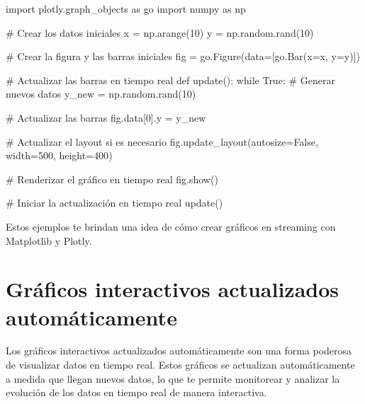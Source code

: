 \documentclass[
  a4paper,
]{article}
\newenvironment{Shaded}{}{}
\newcommand{\CommentTok}[1]{\textcolor[rgb]{0.42,0.45,0.49}{#1}}
\newcommand{\ControlFlowTok}[1]{\textcolor[rgb]{0.84,0.23,0.29}{#1}}
\newcommand{\DecValTok}[1]{\textcolor[rgb]{0.00,0.36,0.77}{#1}}
\newcommand{\ImportTok}[1]{\textcolor[rgb]{0.01,0.18,0.38}{#1}}
\newcommand{\KeywordTok}[1]{\textcolor[rgb]{0.84,0.23,0.29}{#1}}
\newcommand{\NormalTok}[1]{\textcolor[rgb]{0.14,0.16,0.18}{#1}}
\newcommand{\OperatorTok}[1]{\textcolor[rgb]{0.14,0.16,0.18}{#1}}
\newcommand{\VariableTok}[1]{\textcolor[rgb]{0.89,0.38,0.04}{#1}}
\begin{document}
\begin{Shaded}
\begin{Highlighting}[]
\ImportTok{import}\NormalTok{ plotly.graph\_objects }\ImportTok{as}\NormalTok{ go}
\ImportTok{import}\NormalTok{ numpy }\ImportTok{as}\NormalTok{ np}

\CommentTok{\# Crear los datos iniciales}
\NormalTok{x }\OperatorTok{=}\NormalTok{ np.arange(}\DecValTok{10}\NormalTok{)}
\NormalTok{y }\OperatorTok{=}\NormalTok{ np.random.rand(}\DecValTok{10}\NormalTok{)}

\CommentTok{\# Crear la figura y las barras iniciales}
\NormalTok{fig }\OperatorTok{=}\NormalTok{ go.Figure(data}\OperatorTok{=}\NormalTok{[go.Bar(x}\OperatorTok{=}\NormalTok{x, y}\OperatorTok{=}\NormalTok{y)])}

\CommentTok{\# Actualizar las barras en tiempo real}
\KeywordTok{def}\NormalTok{ update():}
    \ControlFlowTok{while} \VariableTok{True}\NormalTok{:}
        \CommentTok{\# Generar nuevos datos}
\NormalTok{        y\_new }\OperatorTok{=}\NormalTok{ np.random.rand(}\DecValTok{10}\NormalTok{)}

        \CommentTok{\# Actualizar las barras}
\NormalTok{        fig.data[}\DecValTok{0}\NormalTok{].y }\OperatorTok{=}\NormalTok{ y\_new}

        \CommentTok{\# Actualizar el layout si es necesario}
\NormalTok{        fig.update\_layout(autosize}\OperatorTok{=}\VariableTok{False}\NormalTok{, width}\OperatorTok{=}\DecValTok{500}\NormalTok{, height}\OperatorTok{=}\DecValTok{400}\NormalTok{)}

        \CommentTok{\# Renderizar el gráfico en tiempo real}
\NormalTok{        fig.show()}

\CommentTok{\# Iniciar la actualización en tiempo real}
\NormalTok{update()}
\end{Highlighting}
\end{Shaded}

Estos ejemplos te brindan una idea de cómo crear gráficos en streaming
con Matplotlib y Plotly.

\hypertarget{gruxe1ficos-interactivos-actualizados-automuxe1ticamente}{%
\section{Gráficos interactivos actualizados
automáticamente}\label{gruxe1ficos-interactivos-actualizados-automuxe1ticamente}}

Los gráficos interactivos actualizados automáticamente son una forma
poderosa de visualizar datos en tiempo real. Estos gráficos se
actualizan automáticamente a medida que llegan nuevos datos, lo que te
permite monitorear y analizar la evolución de los datos en tiempo real
de manera interactiva.
\end{document}
